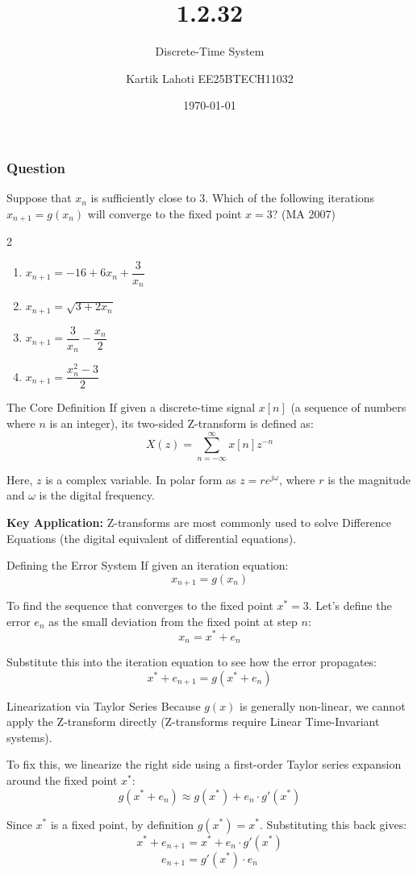 \documentclass{beamer}
\title{1.2.32}
\subtitle{Discrete-Time System}
\author{Kartik Lahoti EE25BTECH11032}
\date{\today}
\begin{document}
\begin{frame}
    \titlepage
\end{frame}

\begin{frame}
    \frametitle{Question}
    \item Suppose that $x_n$ is sufficiently close to 3. Which of the following iterations $x_{n+1} = g(x_n)$ will converge to the fixed point $x = 3$?
\hfill (MA 2007)
\begin{multicols}{2}
    \begin{enumerate}
        \item $x_{n+1} = -16 + 6x_n + \dfrac{3}{x_n}$
        \item $x_{n+1} = \sqrt{3 + 2x_n}$
        \item $x_{n+1} = \dfrac{3}{x_n} - \dfrac{x_n}{2}$
        \item $x_{n+1} = \dfrac{x_n^2 - 3}{2}$
    \end{enumerate}
    \end{multicols}
\end{frame}

\begin{frame}{The Core Definition}
    If given a discrete-time signal $x[n]$ (a sequence of numbers where $n$ is an integer), its two-sided Z-transform is defined as:
    $$X(z) = \sum_{n=-\infty}^{\infty} x[n] z^{-n}$$
    
    Here, $z$ is a complex variable. In polar form as $z = re^{j\omega}$, where $r$ is the magnitude and $\omega$ is the digital frequency.
    
    \vspace{0.3cm}
    \textbf{Key Application:} Z-transforms are most commonly used to solve Difference Equations (the digital equivalent of differential equations).
\end{frame}

\begin{frame}{Defining the Error System}
    If given an iteration equation:
    $$x_{n+1} = g(x_n)$$
    
    To find the sequence that converges to the fixed point $x^* = 3$. Let's define the error $e_n$ as the small deviation from the fixed point at step $n$:
    $$x_n = x^* + e_n$$
    
    Substitute this into the iteration equation to see how the error propagates:
    $$x^* + e_{n+1} = g(x^* + e_n)$$
\end{frame}

\begin{frame}{Linearization via Taylor Series}
    Because $g(x)$ is generally non-linear, we cannot apply the Z-transform directly (Z-transforms require Linear Time-Invariant systems). 
    
    \vspace{0.2cm}
    To fix this, we linearize the right side using a first-order Taylor series expansion around the fixed point $x^*$:
    $$g(x^* + e_n) \approx g(x^*) + e_n \cdot g'(x^*)$$
    
    Since $x^*$ is a fixed point, by definition $g(x^*) = x^*$. Substituting this back gives:
    $$x^* + e_{n+1} = x^* + e_n \cdot g'(x^*)$$
    $$e_{n+1} = g'(x^*) \cdot e_n$$
\end{frame}
\end{document}

